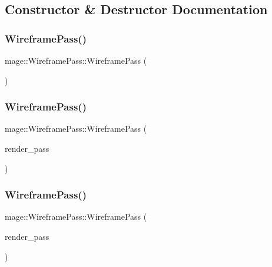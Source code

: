 \subsection{Constructor \& Destructor Documentation}
\hypertarget{classmage_1_1_wireframe_pass_a7323b3caca5d06a068a89c0333651f04}{}\label{classmage_1_1_wireframe_pass_a7323b3caca5d06a068a89c0333651f04} 
\subsubsection{\texorpdfstring{Wireframe\+Pass()}{WireframePass()}\hspace{0.1cm}{\footnotesize\ttfamily [1/3]}}
{\footnotesize\ttfamily mage\+::\+Wireframe\+Pass\+::\+Wireframe\+Pass (\begin{DoxyParamCaption}{ }\end{DoxyParamCaption})}

\hypertarget{classmage_1_1_wireframe_pass_a3e070108925c2ef3b4feaa29dbf605f2}{}\label{classmage_1_1_wireframe_pass_a3e070108925c2ef3b4feaa29dbf605f2} 
\subsubsection{\texorpdfstring{Wireframe\+Pass()}{WireframePass()}\hspace{0.1cm}{\footnotesize\ttfamily [2/3]}}
{\footnotesize\ttfamily mage\+::\+Wireframe\+Pass\+::\+Wireframe\+Pass (\begin{DoxyParamCaption}\item[{const \hyperlink{classmage_1_1_wireframe_pass}{Wireframe\+Pass} \&}]{render\+\_\+pass }\end{DoxyParamCaption})\hspace{0.3cm}{\ttfamily [delete]}}

\hypertarget{classmage_1_1_wireframe_pass_a08631bc9b341bed85b1b14b99affb1f0}{}\label{classmage_1_1_wireframe_pass_a08631bc9b341bed85b1b14b99affb1f0} 
\subsubsection{\texorpdfstring{Wireframe\+Pass()}{WireframePass()}\hspace{0.1cm}{\footnotesize\ttfamily [3/3]}}
{\footnotesize\ttfamily mage\+::\+Wireframe\+Pass\+::\+Wireframe\+Pass (\begin{DoxyParamCaption}\item[{\hyperlink{classmage_1_1_wireframe_pass}{Wireframe\+Pass} \&\&}]{render\+\_\+pass }\end{DoxyParamCaption})\hspace{0.3cm}{\ttfamily [default]}}

